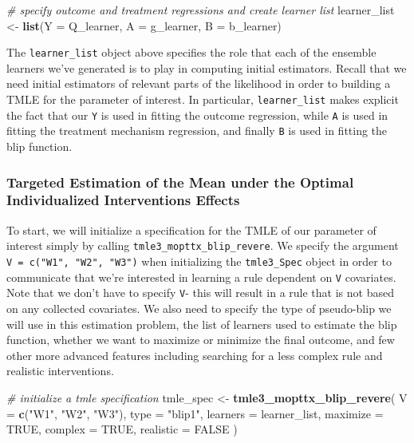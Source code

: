 \documentclass[12pt, krantz2,]{krantz}
\newenvironment{Shaded}{\begin{snugshade}}{\end{snugshade}}
\newcommand{\CommentTok}[1]{\textcolor[rgb]{0.37,0.37,0.37}{\textit{#1}}}
\newcommand{\DataTypeTok}[1]{\textcolor[rgb]{0.27,0.27,0.27}{#1}}
\newcommand{\KeywordTok}[1]{\textcolor[rgb]{0.27,0.27,0.27}{\textbf{#1}}}
\newcommand{\NormalTok}[1]{#1}
\newcommand{\OtherTok}[1]{\textcolor[rgb]{0.37,0.37,0.37}{#1}}
\newcommand{\StringTok}[1]{\textcolor[rgb]{0.5,0.5,0.5}{#1}}
\theoremstyle{definition}
\theoremstyle{definition}
\theoremstyle{definition}
\newcommand{\1}{\mathbbm{1}}
\begin{document}
\begin{Shaded}
\begin{Highlighting}[]
\CommentTok{# specify outcome and treatment regressions and create learner list}
\NormalTok{learner_list <-}\StringTok{ }\KeywordTok{list}\NormalTok{(}\DataTypeTok{Y =}\NormalTok{ Q_learner, }\DataTypeTok{A =}\NormalTok{ g_learner, }\DataTypeTok{B =}\NormalTok{ b_learner)}
\end{Highlighting}
\end{Shaded}

The \texttt{learner\_list} object above specifies the role that each of the ensemble
learners we've generated is to play in computing initial estimators. Recall that
we need initial estimators of relevant parts of the likelihood in order to
building a TMLE for the parameter of interest. In particular, \texttt{learner\_list}
makes explicit the fact that our \texttt{Y} is used in fitting the outcome regression,
while \texttt{A} is used in fitting the treatment mechanism regression, and finally \texttt{B}
is used in fitting the blip function.

\hypertarget{targeted-estimation-of-the-mean-under-the-optimal-individualized-interventions-effects}{%
\subsubsection{Targeted Estimation of the Mean under the Optimal Individualized Interventions Effects}\label{targeted-estimation-of-the-mean-under-the-optimal-individualized-interventions-effects}}

To start, we will initialize a specification for the TMLE of our parameter of
interest simply by calling \texttt{tmle3\_mopttx\_blip\_revere}. We specify the argument
\texttt{V\ =\ c("W1",\ "W2",\ "W3")} when initializing the \texttt{tmle3\_Spec} object in order to
communicate that we're interested in learning a rule dependent on \texttt{V}
covariates. Note that we don't have to specify \texttt{V}- this will result in a rule
that is not based on any collected covariates. We also need to specify the type
of pseudo-blip we will use in this estimation problem, the list of learners used
to estimate the blip function, whether we want to maximize or minimize the final
outcome, and few other more advanced features including searching for a less
complex rule and realistic interventions.

\begin{Shaded}
\begin{Highlighting}[]
\CommentTok{# initialize a tmle specification}
\NormalTok{tmle_spec <-}\StringTok{ }\KeywordTok{tmle3_mopttx_blip_revere}\NormalTok{(}
  \DataTypeTok{V =} \KeywordTok{c}\NormalTok{(}\StringTok{"W1"}\NormalTok{, }\StringTok{"W2"}\NormalTok{, }\StringTok{"W3"}\NormalTok{), }\DataTypeTok{type =} \StringTok{"blip1"}\NormalTok{,}
  \DataTypeTok{learners =}\NormalTok{ learner_list,}
  \DataTypeTok{maximize =} \OtherTok{TRUE}\NormalTok{, }\DataTypeTok{complex =} \OtherTok{TRUE}\NormalTok{, }\DataTypeTok{realistic =} \OtherTok{FALSE}
\NormalTok{)}
\end{Highlighting}
\end{Shaded}
\end{document}
